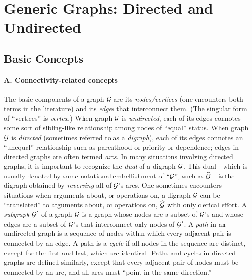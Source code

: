 \section{Generic Graphs: Directed and Undirected}
\label{sec:graphs-generic}

\subsection{Basic Concepts}

\paragraph{\small\sf A. Connectivity-related concepts}

The basic components of a graph $\mbox{$\cal G$}$ are its {\em nodes/vertices}
  
 (one encounters both terms in the
literature) and its {\em edges}   that interconnect them.  (The singular form of ``vertices''
is {\it vertex}.)   
When graph $\mbox{$\cal G$}$ is {\em undirected},  each of
its edges connotes some sort of sibling-like relationship among nodes
of ``equal'' status.  When graph $\mbox{$\cal G$}$ is {\em directed}
 (sometimes referred to as a {\em digraph}),
  each of its edges connotes an
``unequal'' relationship such as parenthood or priority or dependence;
edges in directed graphs are often termed {\em
  arcs}.  
 In many situations involving directed
graphs, it is important to recognize the {\em dual}
 of a digraph $\mbox{$\cal G$}$.  This dual---which is
usually denoted by some notational embellishment of ``$\mbox{$\cal G$}$'', such as
$\widehat{\mbox{$\cal G$}}$---is the digraph obtained by {\em reversing} all of
$\mbox{$\cal G$}$'s arcs.  One sometimes encounters situations when arguments
about, or operations on, a digraph $\mbox{$\cal G$}$ can be ``translated'' to
arguments about, or operations on, $\widehat{\mbox{$\cal G$}}$ with only clerical
effort.  A {\em subgraph} $\mbox{$\cal G$}'$ of a graph $\mbox{$\cal G$}$ is a graph whose nodes
are a subset of $\mbox{$\cal G$}$'s and whose edges are a subset of $\mbox{$\cal G$}$'s that
interconnect only nodes of $\mbox{$\cal G$}'$.  A {\em path} 
 in an undirected graph is a sequence of
nodes within which every adjacent pair is connected by an edge.  A
path is a {\em cycle}  
if all nodes in the sequence are distinct, except for the first and
last, which are identical.  Paths and cycles in directed graphs are
defined similarly, except that every adjacent pair of nodes must be
connected by an arc, and all arcs must ``point in the same
direction.''

